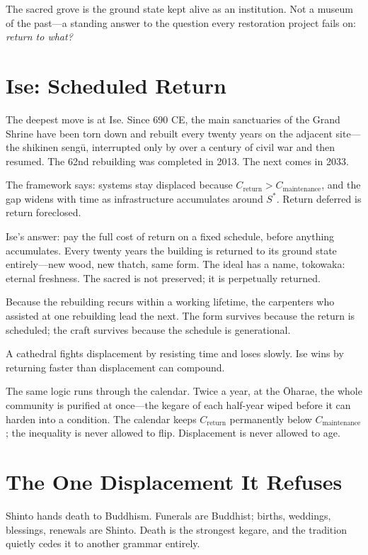 \documentclass[12pt]{article}
\begin{document}
The sacred grove is the ground state kept alive as an institution. Not a museum of the past---a standing answer to the question every restoration project fails on: \emph{return to what?}

\section{Ise: Scheduled Return}

The deepest move is at Ise. Since 690 CE, the main sanctuaries of the Grand Shrine have been torn down and rebuilt every twenty years on the adjacent site---the shikinen sengū, interrupted only by over a century of civil war and then resumed. The 62nd rebuilding was completed in 2013. The next comes in 2033.

The framework says: systems stay displaced because $C_{\text{return}} > C_{\text{maintenance}}$, and the gap widens with time as infrastructure accumulates around $S^*$. Return deferred is return foreclosed.

Ise's answer: pay the full cost of return on a fixed schedule, before anything accumulates. Every twenty years the building is returned to its ground state entirely---new wood, new thatch, same form. The ideal has a name, tokowaka: eternal freshness. The sacred is not preserved; it is perpetually returned.

Because the rebuilding recurs within a working lifetime, the carpenters who assisted at one rebuilding lead the next. The form survives because the return is scheduled; the craft survives because the schedule is generational.

A cathedral fights displacement by resisting time and loses slowly. Ise wins by returning faster than displacement can compound.

The same logic runs through the calendar. Twice a year, at the Ōharae, the whole community is purified at once---the kegare of each half-year wiped before it can harden into a condition. The calendar keeps $C_{\text{return}}$ permanently below $C_{\text{maintenance}}$; the inequality is never allowed to flip. Displacement is never allowed to age.

\section{The One Displacement It Refuses}

Shinto hands death to Buddhism. Funerals are Buddhist; births, weddings, blessings, renewals are Shinto. Death is the strongest kegare, and the tradition quietly cedes it to another grammar entirely.
\end{document}
